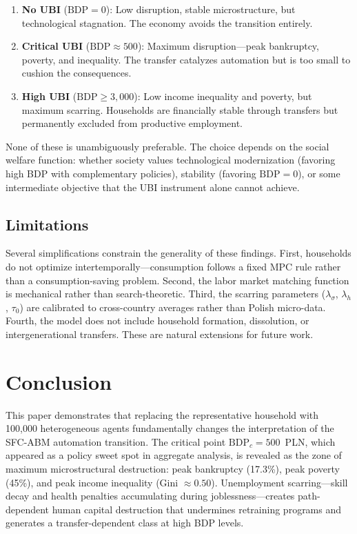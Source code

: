 \documentclass[12pt,a4paper]{article}
\begin{document}
\begin{enumerate}
  \item \textbf{No UBI} ($\mathrm{BDP} = 0$): Low disruption, stable
    microstructure, but technological stagnation. The economy avoids the
    transition entirely.
  \item \textbf{Critical UBI} ($\mathrm{BDP} \approx 500$): Maximum
    disruption---peak bankruptcy, poverty, and inequality. The transfer
    catalyzes automation but is too small to cushion the consequences.
  \item \textbf{High UBI} ($\mathrm{BDP} \geq 3{,}000$): Low income
    inequality and poverty, but maximum scarring. Households are
    financially stable through transfers but permanently excluded from
    productive employment.
\end{enumerate}

None of these is unambiguously preferable. The choice depends on the
social welfare function: whether society values technological
modernization (favoring high BDP with complementary policies), stability
(favoring $\mathrm{BDP} = 0$), or some intermediate objective that the
UBI instrument alone cannot achieve.

\subsection{Limitations}

Several simplifications constrain the generality of these findings.
First, households do not optimize intertemporally---consumption follows
a fixed MPC rule rather than a consumption-saving problem. Second, the
labor market matching function is mechanical rather than search-theoretic.
Third, the scarring parameters ($\lambda_\sigma$, $\lambda_h$,
$\tau_0$) are calibrated to cross-country averages rather than Polish
micro-data. Fourth, the model does not include household formation,
dissolution, or intergenerational transfers. These are natural extensions
for future work.

\section{Conclusion}
\label{sec:conclusion}

This paper demonstrates that replacing the representative household with
100,000 heterogeneous agents fundamentally changes the interpretation of
the SFC-ABM automation transition. The critical point
$\mathrm{BDP}_c = 500$~PLN, which appeared as a policy sweet spot in
aggregate analysis, is revealed as the zone of maximum microstructural
destruction: peak bankruptcy (17.3\%), peak poverty (45\%), and peak
income inequality (Gini $\approx 0.50$). Unemployment scarring---skill
decay and health penalties accumulating during joblessness---creates
path-dependent human capital destruction that undermines retraining
programs and generates a transfer-dependent class at high BDP levels.
\end{document}
